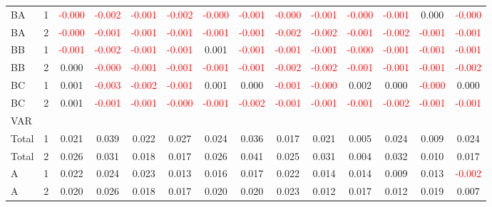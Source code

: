 \begin{table}[!htb]
{\begin{tabular}{llcccccccccccc}
BA & 1 & \textcolor{red}{-0.000} & \textcolor{red}{-0.002} & \textcolor{red}{-0.001} & \textcolor{red}{-0.002} & \textcolor{red}{-0.000} & \textcolor{red}{-0.001} & \textcolor{red}{-0.000} & \textcolor{red}{-0.001} & \textcolor{red}{-0.000} & \textcolor{red}{-0.001} & 0.000 & \textcolor{red}{-0.000}\\
BA & 2 & \textcolor{red}{-0.000} & \textcolor{red}{-0.001} & \textcolor{red}{-0.001} & \textcolor{red}{-0.001} & \textcolor{red}{-0.001} & \textcolor{red}{-0.001} & \textcolor{red}{-0.002} & \textcolor{red}{-0.002} & \textcolor{red}{-0.001} & \textcolor{red}{-0.002} & \textcolor{red}{-0.001} & \textcolor{red}{-0.001}\\
BB & 1 & \textcolor{red}{-0.001} & \textcolor{red}{-0.002} & \textcolor{red}{-0.001} & \textcolor{red}{-0.001} & 0.001 & \textcolor{red}{-0.001} & \textcolor{red}{-0.001} & \textcolor{red}{-0.001} & \textcolor{red}{-0.000} & \textcolor{red}{-0.001} & \textcolor{red}{-0.001} & \textcolor{red}{-0.001}\\
BB & 2 & 0.000 & \textcolor{red}{-0.000} & \textcolor{red}{-0.001} & \textcolor{red}{-0.001} & \textcolor{red}{-0.001} & \textcolor{red}{-0.001} & \textcolor{red}{-0.002} & \textcolor{red}{-0.002} & \textcolor{red}{-0.001} & \textcolor{red}{-0.001} & \textcolor{red}{-0.001} & \textcolor{red}{-0.002}\\
BC & 1 & 0.001 & \textcolor{red}{-0.003} & \textcolor{red}{-0.002} & \textcolor{red}{-0.001} & 0.001 & 0.000 & \textcolor{red}{-0.001} & \textcolor{red}{-0.000} & 0.002 & 0.000 & \textcolor{red}{-0.000} & 0.000\\
BC & 2 & 0.001 & \textcolor{red}{-0.001} & \textcolor{red}{-0.001} & \textcolor{red}{-0.000} & \textcolor{red}{-0.001} & \textcolor{red}{-0.002} & \textcolor{red}{-0.001} & \textcolor{red}{-0.001} & \textcolor{red}{-0.001} & \textcolor{red}{-0.002} & \textcolor{red}{-0.001} & \textcolor{red}{-0.001}\\
\hline
VAR &  &  &  &  &  &  &  &  &  &  &  &  & \\
\hline
Total & 1 & 0.021 & 0.039 & 0.022 & 0.027 & 0.024 & 0.036 & 0.017 & 0.021 & 0.005 & 0.024 & 0.009 & 0.024\\
Total & 2 & 0.026 & 0.031 & 0.018 & 0.017 & 0.026 & 0.041 & 0.025 & 0.031 & 0.004 & 0.032 & 0.010 & 0.017\\
A & 1 & 0.022 & 0.024 & 0.023 & 0.013 & 0.016 & 0.017 & 0.022 & 0.014 & 0.014 & 0.009 & 0.013 & \textcolor{red}{-0.002}\\
A & 2 & 0.020 & 0.026 & 0.018 & 0.017 & 0.020 & 0.020 & 0.023 & 0.012 & 0.017 & 0.012 & 0.019 & 0.007\\

\end{tabular}}
\end{table}
